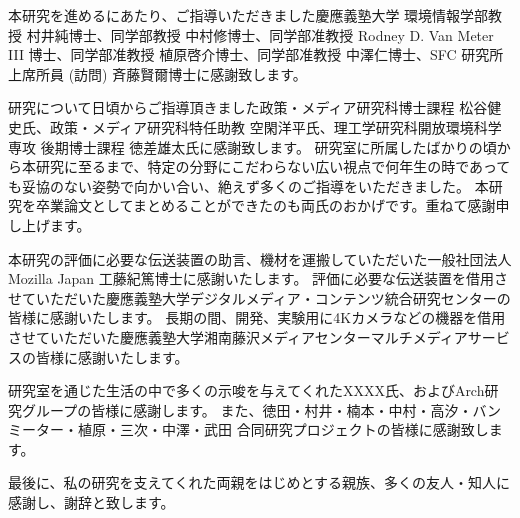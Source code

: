 \begin{acknowledgment}

本研究を進めるにあたり、ご指導いただきました慶應義塾大学 環境情報学部教授 村井純博士、同学部教授 中村修博士、同学部准教授 Rodney D. Van Meter III 博士、同学部准教授 植原啓介博士、同学部准教授 中澤仁博士、SFC 研究所 上席所員 (訪問) 斉藤賢爾博士に感謝致します。

研究について日頃からご指導頂きました政策・メディア研究科博士課程 松谷健史氏、政策・メディア研究科特任助教 空閑洋平氏、理工学研究科開放環境科学専攻 後期博士課程 徳差雄太氏に感謝致します。
研究室に所属したばかりの頃から本研究に至るまで、特定の分野にこだわらない広い視点で何年生の時であっても妥協のない姿勢で向かい合い、絶えず多くのご指導をいただきました。
本研究を卒業論文としてまとめることができたのも両氏のおかげです。重ねて感謝申し上げます。

本研究の評価に必要な伝送装置の助言、機材を運搬していただいた一般社団法人 Mozilla Japan 工藤紀篤博士に感謝いたします。
評価に必要な伝送装置を借用させていただいた慶應義塾大学デジタルメディア・コンテンツ統合研究センターの皆様に感謝いたします。
長期の間、開発、実験用に4Kカメラなどの機器を借用させていただいた慶應義塾大学湘南藤沢メディアセンターマルチメディアサービスの皆様に感謝いたします。

研究室を通じた生活の中で多くの示唆を与えてくれたXXXX氏、およびArch研究グループの皆様に感謝します。
また、徳田・村井・楠本・中村・高汐・バンミーター・植原・三次・中澤・武田 合同研究プロジェクトの皆様に感謝致します。

最後に、私の研究を支えてくれた両親をはじめとする親族、多くの友人・知人に感謝し、謝辞と致します。


\end{acknowledgment}
